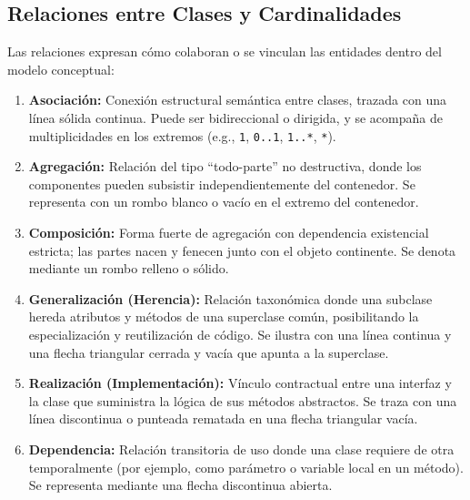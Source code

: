 \documentclass[letterpaper,12pt,oneside]{article}
\numberwithin{figure}{section}
\begin{document}
\subsection{Relaciones entre Clases y Cardinalidades}
Las relaciones expresan c\'omo colaboran o se vinculan las entidades dentro del modelo conceptual:
\begin{enumerate}
    \item \textbf{Asociaci\'on:} Conexi\'on estructural sem\'antica entre clases, trazada con una l\'inea s\'olida continua. Puede ser bidireccional o dirigida, y se acompa\~na de multiplicidades en los extremos (e.g., \texttt{1}, \texttt{0..1}, \texttt{1..*}, \texttt{*}).
    \item \textbf{Agregaci\'on:} Relaci\'on del tipo ``todo-parte'' no destructiva, donde los componentes pueden subsistir independientemente del contenedor. Se representa con un rombo blanco o vac\'io en el extremo del contenedor.
    \item \textbf{Composici\'on:} Forma fuerte de agregaci\'on con dependencia existencial estricta; las partes nacen y fenecen junto con el objeto continente. Se denota mediante un rombo relleno o s\'olido.
    \item \textbf{Generalizaci\'on (Herencia):} Relaci\'on taxon\'omica donde una subclase hereda atributos y m\'etodos de una superclase com\'un, posibilitando la especializaci\'on y reutilizaci\'on de c\'odigo. Se ilustra con una l\'inea continua y una flecha triangular cerrada y vac\'ia que apunta a la superclase.
    \item \textbf{Realizaci\'on (Implementaci\'on):} V\'inculo contractual entre una interfaz y la clase que suministra la l\'ogica de sus m\'etodos abstractos. Se traza con una l\'inea discontinua o punteada rematada en una flecha triangular vac\'ia.
    \item \textbf{Dependencia:} Relaci\'on transitoria de uso donde una clase requiere de otra temporalmente (por ejemplo, como par\'ametro o variable local en un m\'etodo). Se representa mediante una flecha discontinua abierta.
\end{enumerate}
\end{document}
